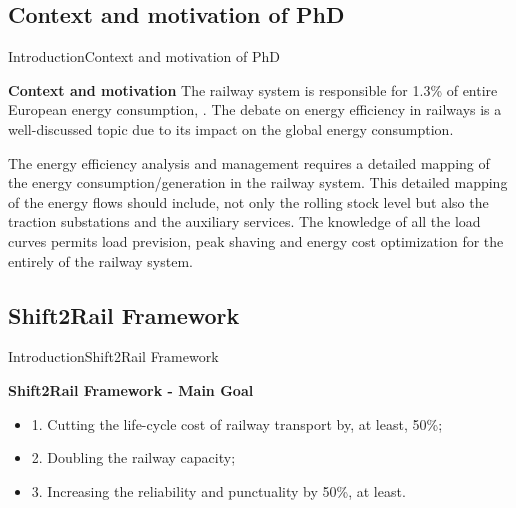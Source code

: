 \subsection{Context and motivation of PhD}

\begin{frame}{Introduction}{Context and motivation of PhD}
	\begin{block}{\textbf{Context and motivation}}
		The railway system is responsible for 1.3\% of entire European energy consumption, \cite{iea-uic2016}. 
		The debate on energy efficiency in railways is a well-discussed topic due to its impact on the global energy consumption.
		
		The energy efficiency analysis and management requires a detailed mapping of the energy consumption/generation in the railway system. 
		This detailed mapping of the energy flows should include, not only the rolling stock level but also the traction substations and the auxiliary services.
		The knowledge of all the load curves permits load prevision, peak shaving and energy cost optimization for the entirely of the railway system.
		
	\end{block}
\end{frame}

\subsection{Shift2Rail Framework}
\begin{frame}{Introduction}{Shift2Rail Framework}
\begin{block}{\textbf{Shift2Rail Framework - Main Goal}}
	\begin{itemize}
		\setlength\itemsep{-0.5em}
		\item 1. Cutting the life-cycle cost of railway transport by, at least, 50\%;
		\item 2. Doubling the railway capacity;
		\item 3. Increasing the reliability and punctuality by 50\%, at least.
	\end{itemize}
	
\end{block}
\end{frame}

